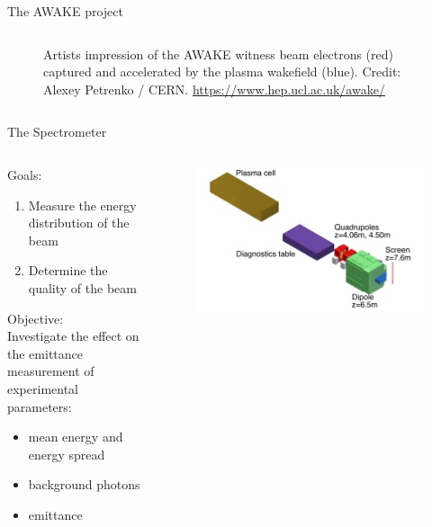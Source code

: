 \documentclass[aspectratio=169]{beamer}
\begin{document}
\begin{frame}{The AWAKE project}
\begin{columns}
\begin{column}{.5\linewidth}
\begin{figure}[h]
				\caption{Artists impression of the AWAKE witness beam electrons
				(red) captured and accelerated by the plasma wakefield (blue).
				Credit: Alexey Petrenko / CERN. \url{https://www.hep.ucl.ac.uk/awake/}}
			\end{figure}
		\end{column}
	\end{columns}

\end{frame}

\begin{frame}{The Spectrometer}
	\begin{columns}
		\begin{column}{0.6\linewidth}
			Goals:
			\begin{enumerate}
				\item Measure the energy distribution of the beam
				\item Determine the quality of the beam
			\end{enumerate}
			\vspace{1em}
			Objective:\\
			\hspace*{18pt} Investigate the effect on the emittance measurement of
			experimental parameters:
			\begin{itemize}
				\item mean energy and energy spread
				\item background photons
				\item emittance
			\end{itemize}
		\end{column}
		\begin{column}{0.4\linewidth}
			\begin{figure}[h]
				\centering
				\includegraphics[width=\linewidth]{spectrometer}

\end{figure}
\end{column}
\end{columns}
\end{frame}
\end{document}
